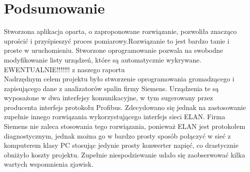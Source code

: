 \section{Podsumowanie}
Stworzona aplikacja oparta, o zaproponowane rozwiązanie, pozwoliła znacząco uprościć i przyśpieszyć proces pomiarowy.Rozwiązanie to jest bardzo tanie i proste w uruchomieniu. Stworzone oprogramowanie pozwala na swobodne modyfikowanie listy urządzeń, które są automatycznie wykrywane. \vspace{1cm} \\
EWENTUALNIE!!!!!!! z naszego raportu \\
Nadrzędnym celem projektu było stworzenie oprogramowania gromadzącego i zapisującego dane z analizatorów spalin firmy Siemens. Urządzenia te są wyposażone w dwa interfejsy komunikacyjne, w tym sugerowany przez producenta interfejs protokołu Profibus. Zdecydowano się jednak na zastosowanie zupełnie innego rozwiązania wykorzystującego interfejs sieci ELAN. Firma Siemens nie zaleca stosowania tego rozwiązania, ponieważ ELAN jest protokołem diagnostycznym, jednak można go w bardzo prosty sposób połączyć w sieć z komputerem klasy PC stosując jedynie prosty konwerter napięć, co drastycznie obniżyło koszty projektu. Zupełnie niespodziewanie udało się zaobserwować kilka wartych wspomnienia zjawisk.
